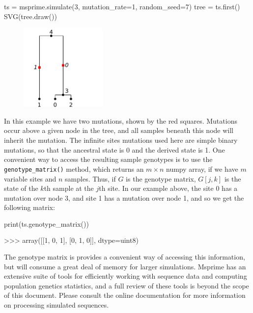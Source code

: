 \documentclass[graybox]{svmult}
\newcommand{\includenbimage}[1]{\begin{center}\texttt{[image: \#1]}\end{center}}
\begin{document}
\begin{pythoncode}
ts = msprime.simulate(3, mutation_rate=1, random_seed=7)
tree = ts.first()
SVG(tree.draw())
\end{pythoncode}

\begin{figure}
  \begin{center}
    \includegraphics[width=0.38\textwidth]{images/simulations_19_0.pdf}
  \end{center}
\end{figure}
    In this example we have two mutations, shown by the red squares.
Mutations occur above a given node in the tree, and all samples beneath
this node will inherit the mutation. The infinite sites mutations used
here are simple binary mutations, so that the ancestral state is 0 and
the derived state is 1. One convenient way to access the resulting
sample genotypes is to use the \texttt{genotype\_matrix()} method, which
returns an \(m \times n\) numpy array, if we have \(m\) variable sites
and \(n\) samples. Thus, if \(G\) is the genotype matrix, \(G[j, k]\) is
the state of the \(k\)th sample at the \(j\)th site. In our example
above, the site 0 has a mutation over node 3, and site 1 has a mutation
over node 1, and so we get the following matrix:

\begin{pythoncode}
print(ts.genotype_matrix())

>>> array([[1, 0, 1],
           [0, 1, 0]], dtype=uint8)
\end{pythoncode}

    The genotype matrix is provides a convenient way of accessing this
information, but will consume a great deal of memory for larger
simulations. Msprime has an extensive suite of tools for efficiently
working with sequence data and computing population genetics statistics,
and a full review of these tools is beyond the scope of this document.
Please consult the online documentation for more information on
processing simulated sequences.
\end{document}
